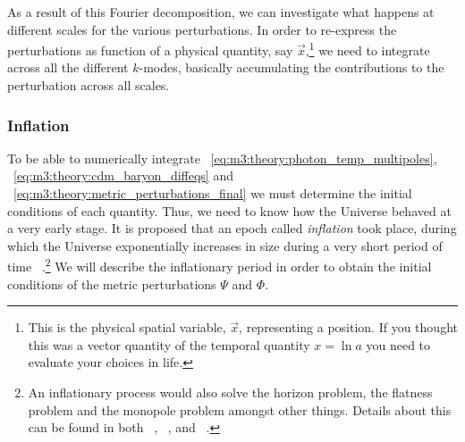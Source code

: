     As a result of this Fourier decomposition, we can investigate what happens at different scales for the various perturbations. In order to re-express the perturbations as function of a physical quantity, say $\vec{x}$,\footnote{This is the physical spatial variable, $\vec{x}$, representing a position. If you thought this was a vector quantity of the temporal quantity $x=\ln{a}$ you need to evaluate your choices in life.} we need to integrate across all the different $k$-modes, basically accumulating the contributions to the perturbation across all scales. 
\subsubsection{Inflation}
    To be able to numerically integrate ~\cref{eq:m3:theory:photon_temp_multipoles}, ~\cref{eq:m3:theory:cdm_baryon_diffeqs} and ~\cref{eq:m3:theory:metric_perturbations_final} we must determine the initial conditions of each quantity. Thus, we need to know how the Universe behaved at a very early stage. It is proposed that an epoch called \textit{inflation} took place, during which the Universe exponentially increases in size during a very short period of time ~\cite{dodelson2020modern}.\footnote{An inflationary process would also solve the horizon problem, the flatness problem and the monopole problem amongst other things. Details about this can be found in both ~\cite{dodelson2020modern}, ~\cite{carroll_2019}, and ~\cite{weinberg2008cosmology}.} We will describe the inflationary period in order to obtain the initial conditions of the metric perturbations $\Psi$ and $\Phi$. 

